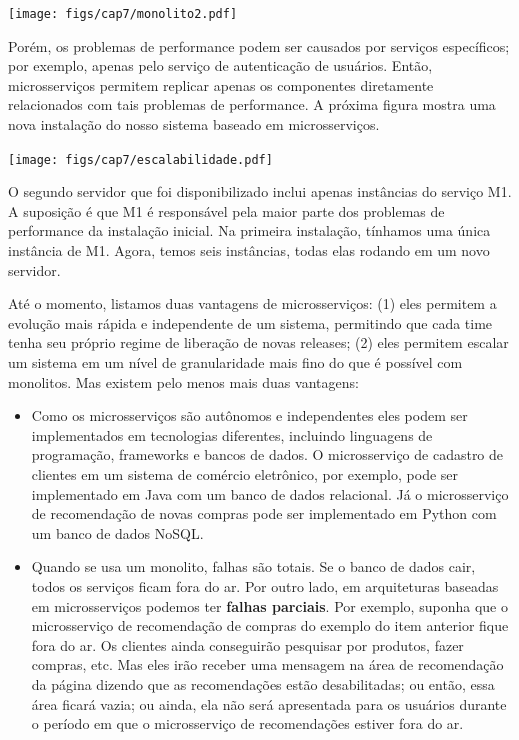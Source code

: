 \documentclass[
  11pt,
  twoside]{book}
\let\origfigure\figure
\let\endorigfigure\endfigure
\renewenvironment{figure}[1][2] {
    \expandafter\origfigure\expandafter[!h]
} {
    \endorigfigure
}
\begin{document}
\begin{figure}
\centering
\texttt{[image: figs/cap7/monolito2.pdf]}
\caption{Servidor 1, executando o monolito em um único processo. E
Servidor 2, executando uma réplica do monolito.}
\end{figure}

Porém, os problemas de performance podem ser causados por serviços
específicos; por exemplo, apenas pelo serviço de autenticação de
usuários. Então, microsserviços permitem replicar apenas os componentes
diretamente relacionados com tais problemas de performance. A próxima
figura mostra uma nova instalação do nosso sistema baseado em
microsserviços.

\begin{figure}
\centering
\texttt{[image: figs/cap7/escalabilidade.pdf]}
\caption{Servidor 1, com todos os microsserviços, exceto M1. Servidor 2,
executando seis processos, todos eles relativos a M1.}
\end{figure}

O segundo servidor que foi disponibilizado inclui apenas instâncias do
serviço M1. A suposição é que M1 é responsável pela maior parte dos
problemas de performance da instalação inicial. Na primeira instalação,
tínhamos uma única instância de M1. Agora, temos seis instâncias, todas
elas rodando em um novo servidor.

Até o momento, listamos duas vantagens de microsserviços: (1) eles
permitem a evolução mais rápida e independente de um sistema, permitindo
que cada time tenha seu próprio regime de liberação de novas releases;
(2) eles permitem escalar um sistema em um nível de granularidade mais
fino do que é possível com monolitos. Mas existem pelo menos mais duas
vantagens:

\begin{itemize}
\item
  Como os microsserviços são autônomos e independentes eles podem ser
  implementados em tecnologias diferentes, incluindo linguagens de
  programação, frameworks e bancos de dados. O microsserviço de cadastro
  de clientes em um sistema de comércio eletrônico, por exemplo, pode
  ser implementado em Java com um banco de dados relacional. Já o
  microsserviço de recomendação de novas compras pode ser implementado
  em Python com um banco de dados NoSQL.
\item
  Quando se usa um monolito, falhas são totais. Se o banco de dados
  cair, todos os serviços ficam fora do ar. Por outro lado, em
  arquiteturas baseadas em microsserviços podemos ter \textbf{falhas
  parciais}.  Por exemplo, suponha que o
  microsserviço de recomendação de compras do exemplo do item anterior
  fique fora do ar. Os clientes ainda conseguirão pesquisar por
  produtos, fazer compras, etc. Mas eles irão receber uma mensagem na
  área de recomendação da página dizendo que as recomendações estão
  desabilitadas; ou então, essa área ficará vazia; ou ainda, ela não
  será apresentada para os usuários durante o período em que o
  microsserviço de recomendações estiver fora do ar.
\end{itemize}
\end{document}
